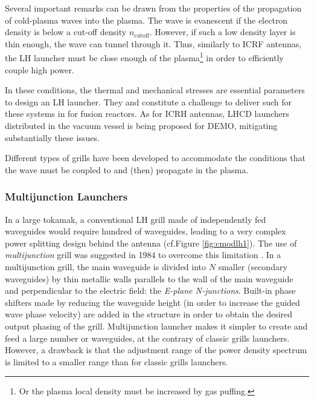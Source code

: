Several important remarks can be drawn from the properties of the propagation of cold-plasma waves into the plasma. The wave is evanescent if the electron density is below a cut-off density $n_{\mathrm{cutoff}}$. However, if such a low density layer is thin enough, the wave can tunnel through it. Thus, similarly to ICRF antennas, the LH launcher must be close enough of the plasma\footnote{Or the plasma local density must be increased by gas puffing.} in order to efficiently couple high power. 

In these conditions, the thermal and mechanical stresses are essential parameters to design an LH launcher. They and constitute a challenge to deliver such for these systems in for fusion reactors. As for ICRH antennas, LHCD launchers distributed in the vacuum vessel is being proposed for DEMO, mitigating substantially these issues.

Different types of grills have been developed to accommodate the conditions that the wave must be coupled to and (then) propagate in the plasma. 

%

\subsubsection{Multijunction Launchers}\label{sec:multijunction}
In a large tokamak, a conventional LH grill made of independently fed waveguides would require hundred of waveguides, leading to a very complex power splitting design behind the antenna (cf.Figure \ref{fig:cmodlh1}). The use of \emph{multijunction} grill was suggested in 1984 to overcome this limitation . In a multijunction grill, the main waveguide is divided into $N$ smaller (secondary waveguides) by thin metallic walls parallels to the wall of the main waveguide and perpendicular to the electric field: the \emph{E-plane N-junctions}. Built-in phase shifters made by reducing the waveguide height (in order to increase the guided wave phase velocity) are added in the structure in order to obtain the desired output phasing of the grill. Multijunction launcher makes it simpler to create and feed a large number or waveguides, at the contrary of classic grills launchers. However, a drawback is that the adjustment range of the power density spectrum is limited to a smaller range than for classic grills launchers.

